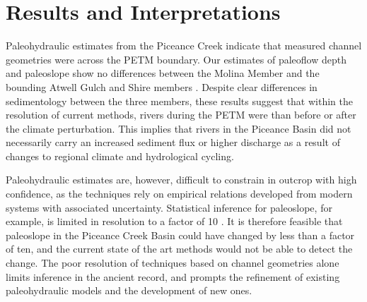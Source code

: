 \documentclass[draft]{compact_proposal}
\begin{document}
\section{Results and Interpretations}


Paleohydraulic estimates from the Piceance Creek indicate that measured channel geometries were  across the PETM boundary.
Our estimates of paleoflow depth and paleoslope show no differences between the Molina Member and the bounding Atwell Gulch and Shire members .
Despite clear differences in sedimentology between the three members, these results suggest that within the resolution of current methods, rivers during the PETM were  than before or after the climate perturbation.
This implies that rivers in the Piceance Basin did not necessarily carry an increased sediment flux or higher discharge as a result of changes to regional climate and hydrological cycling.

Paleohydraulic estimates are, however, difficult to constrain in outcrop with high confidence, as the techniques rely on empirical relations developed from modern systems with associated uncertainty.
Statistical inference for paleoslope, for example, is limited in resolution to a factor of 10 \cnote.
It is therefore feasible that paleoslope in the Piceance Creek Basin could have changed by less than a factor of ten, and the current state of the art methods would not be able to detect the change.
The poor resolution of techniques based on channel geometries alone limits inference in the ancient record, and prompts the refinement of existing paleohydraulic models and the development of new ones.
\end{document}
